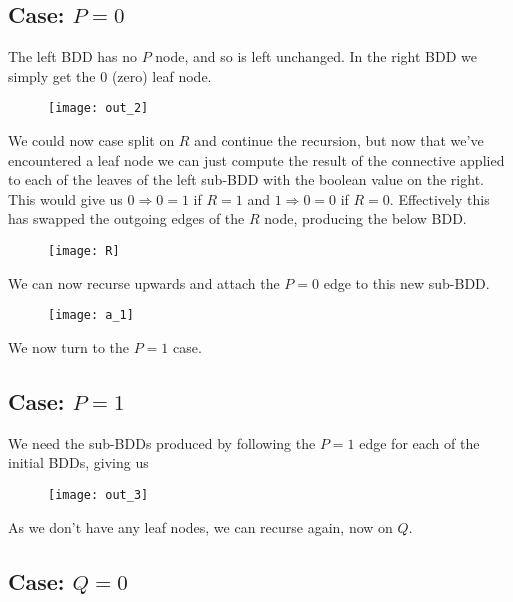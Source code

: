 \documentclass[11pt]{article}
\begin{document}
\subsection{Case: $P=0$}

The left BDD has no $P$ node, and so is left unchanged. In the right BDD we simply get the $0$ (zero) leaf node.

\begin{figure}[H]
	\centering
	\texttt{[image: out\_2]}
\end{figure}

We could now case split on $R$ and continue the recursion, but now that we've encountered a leaf node we can just compute the result of the connective applied to each of the leaves of the left sub-BDD with the boolean value on the right. This would give us $0 \Rightarrow 0 = 1$ if $R=1$ and $1 \Rightarrow 0 = 0$ if $R=0$. Effectively this has swapped the outgoing edges of the $R$ node, producing the below BDD.

\begin{figure}[H]
	\centering
	\texttt{[image: R]}
\end{figure}

We can now recurse upwards and attach the $P=0$ edge to this new sub-BDD.

\begin{figure}[H]
	\centering
	\texttt{[image: a\_1]}
\end{figure}

We now turn to the $P=1$ case.

\pagebreak

\subsection{Case: $P=1$}

We need the sub-BDDs produced by following the $P=1$ edge for each of the initial BDDs, giving us

\begin{figure}[H]
	\centering
	\texttt{[image: out\_3]}
\end{figure}

As we don't have any leaf nodes, we can recurse again, now on $Q$.

\subsection{Case: $Q=0$}
\end{document}
